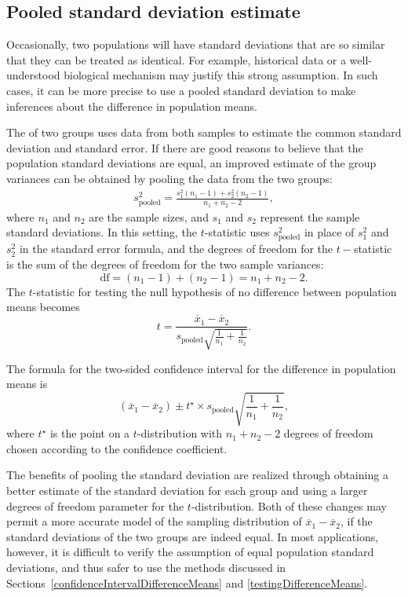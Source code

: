 

\textD{\newpage}


\subsection{Pooled standard deviation estimate}
\label{pooledStandardDeviations}

Occasionally, two populations will have standard deviations that are so similar that they can be treated as identical. For example, historical data or a well-understood biological mechanism may justify this strong assumption. In such cases, it can be more precise to use a pooled standard deviation to make inferences about the difference in population means.

The  of two groups uses data from both samples to estimate the common standard deviation and standard error. If there are good reasons to believe that the population standard deviations are equal, an improved estimate of the group variances can be obtained by pooling the data from the two groups:
\begin{align*}
s_{\text{pooled}}^2 = \frac{s_1^2 (n_1-1) + s_2^2 (n_2-1)}{n_1 + n_2 - 2},
\end{align*}
where $n_1$ and $n_2$ are the sample sizes, and $s_1$ and $s_2$ represent the sample standard deviations. In this setting, the $t$-statistic uses $s_{\text{pooled}}^2$ in place of $s_1^2$ and $s_2^2$ in the standard error formula, and the degrees of freedom for the $t-$statistic is the sum of the degrees of freedom for the two sample variances:
\[
\text{df} = (n_1 - 1) + (n_2 - 1) = n_1 + n_2 - 2.
\]
The $t$-statistic for testing the null hypothesis of no difference between population means becomes 
\[
 t = \frac{\overline{x}_1 - \overline{x}_2}{s_{\text{pooled}}\sqrt{\frac{1}{n_1} + \frac{1}{n_2}}}. 
\]

The formula for the two-sided confidence interval for the difference in population means is
\[
  (\overline{x}_1 - \overline{x}_2) \pm t^{\star} \times s_{\text{pooled}} \sqrt{\frac{1}{n_1} + \frac{1}{n_2}},
\]
where $t^{\star}$ is the point on a $t$-distribution with $n_1 + n_2 -2$ degrees of freedom chosen according to the confidence coefficient.

The benefits of pooling the standard deviation are realized through obtaining a better estimate of the standard deviation for each group and using a larger degrees of freedom parameter for the $t$-distribution. Both of these changes may permit a more accurate model of the sampling distribution of $\overline{x}_1 - \overline{x}_2$, if the standard deviations of the two groups are indeed equal.  In most applications, however, it is difficult to verify the assumption of equal population standard deviations, and thus safer to use the methods discussed in Sections~\ref{confidenceIntervalDifferenceMeans} and \ref{testingDifferenceMeans}.



